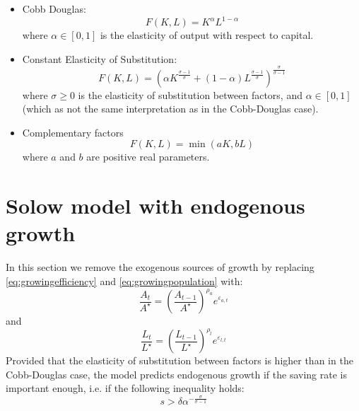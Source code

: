 \documentclass[twoside]{amsart}
\begin{document}
\begin{itemize}
\item Cobb Douglas:
  \[
    F(K, L) = K^{\alpha}L^{1-\alpha}
  \]
  where $\alpha\in[0,1]$ is the elasticity of output with respect to capital.\newline
\item Constant Elasticity of Substitution:
  \[
    F(K, L) = \left(\alpha K^{\frac{\sigma-1}{\sigma}} + (1-\alpha) L^{\frac{\sigma-1}{\sigma}}\right)^{\frac{\sigma}{\sigma-1}}
  \]
  where $\sigma \geq 0$ is the elasticity of substitution between factors, and $\alpha\in[0,1]$ (which as not the same interpretation as in the Cobb-Douglas case).\newline
\item Complementary factors
  \[
    F(K, L) = \min (aK, bL)
  \]
  where $a$ and $b$ are positive real parameters.
\end{itemize}

\section{Solow model with endogenous growth}
\label{sec:2}

In this section we remove the exogenous sources of growth by replacing \ref{eq:growingefficiency} and \ref{eq:growingpopulation} with:
\begin{equation}
  \label{eq:stationarypopulation}
    \frac{A_t}{A^{\star}} = \left(\frac{A_{t-1}}{A^{\star}}\right)^{\rho_a}e^{\varepsilon_{a,t}}
\end{equation}
and
\begin{equation}
  \label{eq:stationarypopulation}
    \frac{L_t}{L^{\star}} = \left(\frac{L_{t-1}}{L^{\star}}\right)^{\rho_l}e^{\varepsilon_{l,t}}
\end{equation}
Provided that the elasticity of substitution between factors is higher
than in the Cobb-Douglas case, the model predicts endogenous growth if
the saving rate is important enough, i.e. if the following inequality
holds:
\[
s > \delta\alpha^{-\frac{\sigma}{\sigma-1}}
\]
\end{document}
